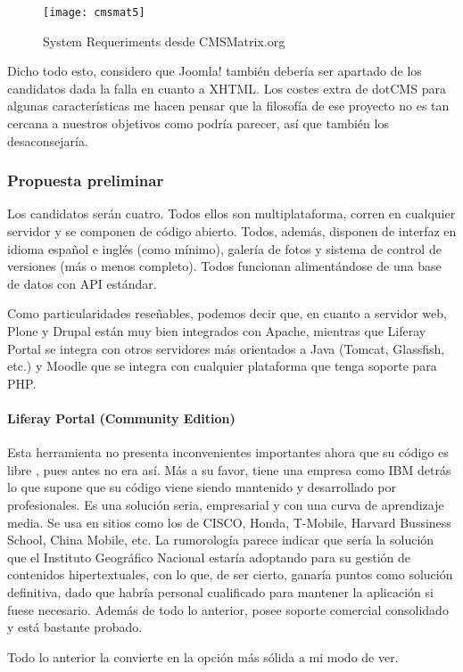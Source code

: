 \begin{figure}
\begin{narrow}{-0.2\linewidth}{-0.2\linewidth}
\centering
\texttt{[image: cmsmat5]}
\caption{System Requeriments desde CMSMatrix.org}
\end{narrow}
\label{fig:cmsmat1}
\end{figure}

\par Dicho todo esto, considero que Joomla! también debería ser apartado de los candidatos dada la falla en cuanto a XHTML. Los costes extra de dotCMS para algunas características me hacen pensar que la filosofía de ese proyecto no es tan cercana a nuestros objetivos como podría parecer, así que también los desaconsejaría.


\subsubsection{Propuesta preliminar}
\par Los candidatos serán cuatro. Todos ellos son multiplataforma, corren en cualquier servidor y se componen de código abierto. Todos, además, disponen de interfaz en idioma español e inglés (como mínimo), galería de fotos y sistema de control de versiones (más o menos completo). Todos funcionan alimentándose de una base de datos con API estándar.
\par Como particularidades reseñables, podemos decir que, en cuanto a servidor web, Plone y Drupal están muy bien integrados con Apache, mientras que Liferay Portal se integra con otros servidores más orientados a Java (Tomcat, Glassfish, etc.) y Moodle que se integra con cualquier plataforma que tenga soporte para PHP.

\paragraph{Liferay Portal (Community Edition)}
\par Esta herramienta no presenta inconvenientes importantes ahora que su código es libre \cite{references:liferaylicense}, pues antes no era así. Más a su favor, tiene una empresa como IBM detrás lo que supone que su código viene siendo mantenido y desarrollado por profesionales. Es una solución seria, empresarial y con una curva de aprendizaje media. Se usa en sitios como los de CISCO, Honda, T-Mobile, Harvard Bussiness School, China Mobile, etc.
La rumorología parece indicar que sería la solución que el Instituto Geográfico Nacional estaría adoptando para su gestión de contenidos hipertextuales, con lo que, de ser cierto, ganaría puntos como solución definitiva, dado que habría personal cualificado para mantener la aplicación si fuese necesario.
Además de todo lo anterior, posee soporte comercial consolidado y está bastante probado.
\par Todo lo anterior la convierte en la opción más sólida a mi modo de ver.


